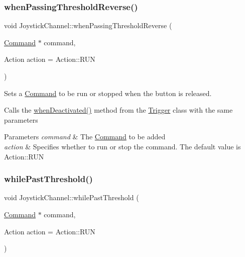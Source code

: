 \subsubsection{\texorpdfstring{whenPassingThresholdReverse()}{whenPassingThresholdReverse()}}
{\footnotesize\ttfamily void Joystick\+Channel\+::when\+Passing\+Threshold\+Reverse (\begin{DoxyParamCaption}\item[{\mbox{\hyperlink{classlib_iterative_robot_1_1_command}{Command}} $\ast$}]{command,  }\item[{Action}]{action = {\ttfamily Action\+:\+:RUN} }\end{DoxyParamCaption})}



Sets a \mbox{\hyperlink{classlib_iterative_robot_1_1_command}{Command}} to be run or stopped when the button is released. 

Calls the \mbox{\hyperlink{classlib_iterative_robot_1_1_trigger_a6459a2d4d3ca0903bb88102d0752a419}{when\+Deactivated()}} method from the \mbox{\hyperlink{classlib_iterative_robot_1_1_trigger}{Trigger}} class with the same parameters


\begin{DoxyParams}{Parameters}
{\em command} & The \mbox{\hyperlink{classlib_iterative_robot_1_1_command}{Command}} to be added \\
\hline
{\em action} & Specifies whether to run or stop the command. The default value is Action\+::\+R\+UN \\
\hline
\end{DoxyParams}
\mbox{\label{classlib_iterative_robot_1_1_joystick_channel_a7a37bb64fd71d3b2cb774c38a83d8977}} 
\subsubsection{\texorpdfstring{whilePastThreshold()}{whilePastThreshold()}}
{\footnotesize\ttfamily void Joystick\+Channel\+::while\+Past\+Threshold (\begin{DoxyParamCaption}\item[{\mbox{\hyperlink{classlib_iterative_robot_1_1_command}{Command}} $\ast$}]{command,  }\item[{Action}]{action = {\ttfamily Action\+:\+:RUN} }\end{DoxyParamCaption})}



